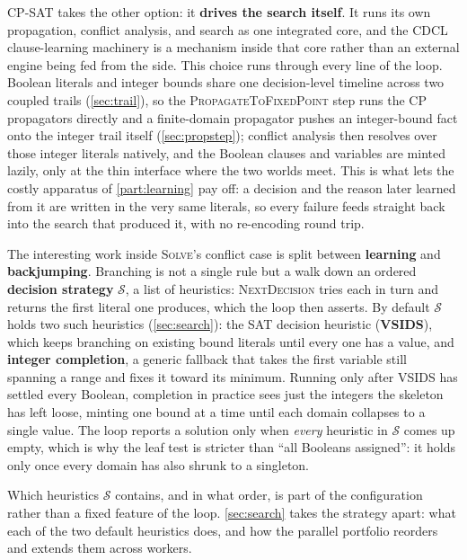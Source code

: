 CP-SAT takes the other option: it \textbf{drives the search itself}. It runs its
own propagation, conflict analysis, and search as one integrated core, and the
CDCL clause-learning machinery is a mechanism inside that core rather than an
external engine being fed from the side. This choice runs through every line of
the loop. Boolean literals and integer bounds share one decision-level timeline across two
coupled trails (\cref{sec:trail}), so the \textsc{PropagateToFixedPoint} step runs the CP
propagators directly and a finite-domain propagator pushes an integer-bound fact
onto the integer trail itself (\cref{sec:propstep}); conflict analysis then resolves
over those integer literals natively, and the Boolean clauses and variables are
minted lazily, only at the thin interface where the two worlds meet. This is what
lets the costly apparatus of \cref{part:learning} pay off: a decision and the
reason later learned from it are written in the very same literals, so every
failure feeds straight back into the search that produced it, with no re-encoding
round trip.

The interesting work inside \textsc{Solve}'s conflict case is split between
\textbf{learning} and \textbf{backjumping}. Branching is not a single rule but a walk down an ordered
\textbf{decision strategy} $\mathcal{S}$, a list of heuristics: \textsc{NextDecision}
tries each in turn and returns the first literal one produces, which the loop then
asserts. By default $\mathcal{S}$
holds two such heuristics (\cref{sec:search}): the SAT decision heuristic
(\textbf{VSIDS}), which keeps branching on existing bound literals until every one
has a value, and \textbf{integer completion}, a generic fallback that takes the
first variable still spanning a range and fixes it toward its minimum. Running only
after VSIDS has settled every Boolean, completion in practice sees just the integers
the skeleton has left loose, minting one bound at a time until each domain
collapses to a single value. The loop reports a solution only when \emph{every} heuristic in
$\mathcal{S}$ comes up empty, which is why the leaf test is stricter than ``all
Booleans assigned'': it holds only once every domain has also shrunk to a
singleton.

Which heuristics $\mathcal{S}$ contains, and in what order, is part of the
configuration rather than a fixed feature of the loop. \cref{sec:search}
takes the strategy apart: what each of the two default heuristics does, and how
the parallel portfolio reorders and extends them across workers.

